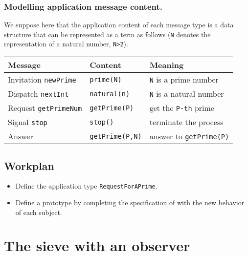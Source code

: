 \documentclass{../llncs}
\begin{document}
  

 
\subsubsection{Modelling application message content.\\}

 
We suppose here that the application content of each message type is a data structure that can be represented as a \prolog{} term as follows (\texttt{N} denotes the representation of a natural number, \texttt{N>2}).


\begin{center}
\begin{tabular}{ | p{} |  p{} | p{} |}
\hline
Message & Content & Meaning\\
\hline
Invitation  \texttt{newPrime} & \texttt{prime(N)} & \texttt{N} is a prime number\\
\hline
Dispatch \texttt{nextInt} & \texttt{natural(n)} & \texttt{N} is a natural number \\
\hline
Request \texttt{getPrimeNum} & \texttt{getPrime(P)} & get the \texttt{P-th} prime\\
\hline
Signal \texttt{stop} & \texttt{stop()} & terminate the process \\
\hline
Answer   & \texttt{getPrime(P,N)} & answer to  \texttt{getPrime(P)} \\
\hline
\end{tabular}
\end{center}

\subsection{Workplan}

\begin{itemize}
\item Define the application type \texttt{RequestForAPrime}.
\item Define a prototype by completing the specification of  with the new behavior of each subject.
\end{itemize}


 
\section{The sieve with an observer}
\end{document}

